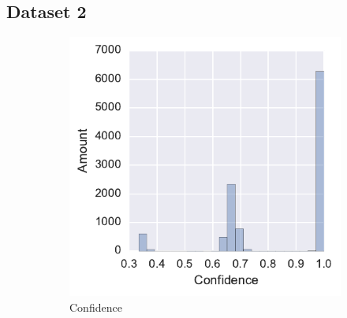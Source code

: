 

\subsection{Dataset 2}

\begin{figure}[h]
    \centering
    \begin{subfigure}[b]{0.46\textwidth}
        \includegraphics[width=\textwidth]{img/sentence-data-judgement-confidence.pdf}
        \caption{Confidence}
\label{fig:sentence-data-judgement-confidence}
    \end{subfigure}
~%
    \begin{subfigure}[b]{0.43\textwidth}

\end{subfigure}
\end{figure}
